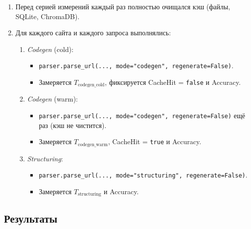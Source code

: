 \begin{enumerate}
    \item Перед серией измерений каждый раз полностью очищался кэш (файлы, SQLite, ChromaDB).
    \item Для каждого сайта и каждого запроса выполнялись:
    \begin{enumerate}
        \item \emph{Codegen} (cold):
        \begin{itemize}
            \item \texttt{parser.parse\_url(..., mode="codegen", regenerate=False)}.
            \item Замеряется $T_{\text{codegen\_cold}}$, фиксируется CacheHit = \texttt{false} и Accuracy.
        \end{itemize}
        \item \emph{Codegen} (warm):
        \begin{itemize}
            \item \texttt{parser.parse\_url(..., mode="codegen", regenerate=False)} ещё раз (кэш не чистится).
            \item Замеряется $T_{\text{codegen\_warm}}$, CacheHit = \texttt{true} и Accuracy.
        \end{itemize}
        \item \emph{Structuring}:
        \begin{itemize}
            \item \texttt{parser.parse\_url(..., mode="structuring", regenerate=False)}.
            \item Замеряется $T_{\text{structuring}}$ и Accuracy.
        \end{itemize}
    \end{enumerate}
\end{enumerate}

\subsection{Результаты}


